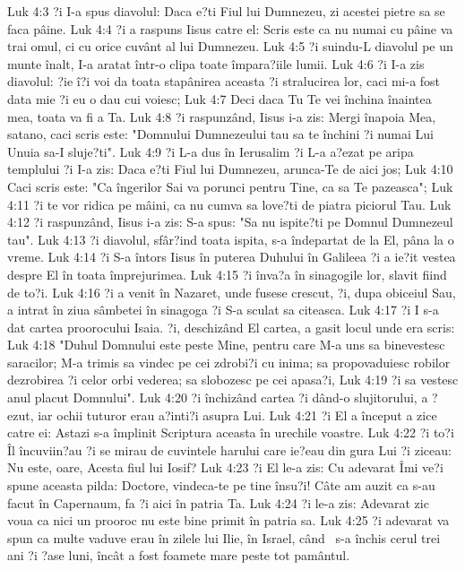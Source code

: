 Luk 4:3  ?i I-a spus diavolul: Daca e?ti Fiul lui Dumnezeu, zi acestei pietre sa se faca pâine.
Luk 4:4  ?i a raspuns Iisus catre el: Scris este ca nu numai cu pâine va trai omul, ci cu orice cuvânt al lui Dumnezeu.
Luk 4:5  ?i suindu-L diavolul pe un munte înalt, I-a aratat într-o clipa toate împara?iile lumii.
Luk 4:6  ?i I-a zis diavolul: ?ie î?i voi da toata stapânirea aceasta ?i stralucirea lor, caci mi-a fost data mie ?i eu o dau cui voiesc;
Luk 4:7  Deci daca Tu Te vei închina înaintea mea, toata va fi a Ta.
Luk 4:8  ?i raspunzând, Iisus i-a zis: Mergi înapoia Mea, satano, caci scris este: "Domnului Dumnezeului tau sa te închini ?i numai Lui Unuia sa-I sluje?ti".
Luk 4:9  ?i L-a dus în Ierusalim ?i L-a a?ezat pe aripa templului ?i I-a zis: Daca e?ti Fiul lui Dumnezeu, arunca-Te de aici jos;
Luk 4:10  Caci scris este: "Ca îngerilor Sai va porunci pentru Tine, ca sa Te pazeasca";
Luk 4:11  ?i te vor ridica pe mâini, ca nu cumva sa love?ti de piatra piciorul Tau.
Luk 4:12  ?i raspunzând, Iisus i-a zis: S-a spus: "Sa nu ispite?ti pe Domnul Dumnezeul tau".
Luk 4:13  ?i diavolul, sfâr?ind toata ispita, s-a îndepartat de la El, pâna la o vreme.
Luk 4:14  ?i S-a întors Iisus în puterea Duhului în Galileea ?i a ie?it vestea despre El în toata împrejurimea.
Luk 4:15  ?i înva?a în sinagogile lor, slavit fiind de to?i.
Luk 4:16  ?i a venit în Nazaret, unde fusese crescut, ?i, dupa obiceiul Sau, a intrat în ziua sâmbetei în sinagoga ?i S-a sculat sa citeasca.
Luk 4:17  ?i I s-a dat cartea proorocului Isaia. ?i, deschizând El cartea, a gasit locul unde era scris:
Luk 4:18  "Duhul Domnului este peste Mine, pentru care M-a uns sa binevestesc saracilor; M-a trimis sa vindec pe cei zdrobi?i cu inima; sa propovaduiesc robilor dezrobirea ?i celor orbi vederea; sa slobozesc pe cei apasa?i,
Luk 4:19  ?i sa vestesc anul placut Domnului".
Luk 4:20  ?i închizând cartea ?i dând-o slujitorului, a ?ezut, iar ochii tuturor erau a?inti?i asupra Lui.
Luk 4:21  ?i El a început a zice catre ei: Astazi s-a împlinit Scriptura aceasta în urechile voastre.
Luk 4:22  ?i to?i Îl încuviin?au ?i se mirau de cuvintele harului care ie?eau din gura Lui ?i ziceau: Nu este, oare, Acesta fiul lui Iosif?
Luk 4:23  ?i El le-a zis: Cu adevarat Îmi ve?i spune aceasta pilda: Doctore, vindeca-te pe tine însu?i! Câte am auzit ca s-au facut în Capernaum, fa ?i aici în patria Ta.
Luk 4:24  ?i le-a zis: Adevarat zic voua ca nici un prooroc nu este bine primit în patria sa.
Luk 4:25  ?i adevarat va spun ca multe vaduve erau în zilele lui Ilie, în Israel, când  s-a închis cerul trei ani ?i ?ase luni, încât a fost foamete mare peste tot pamântul.
